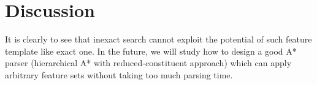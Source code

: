 \section{Discussion}
 	It is clearly to see that inexact search cannot exploit the potential of such feature template like exact one. In the future, we will study how to design a good A* parser (hierarchical A* with reduced-constituent approach) which can apply arbitrary feature sets without taking too much parsing time.